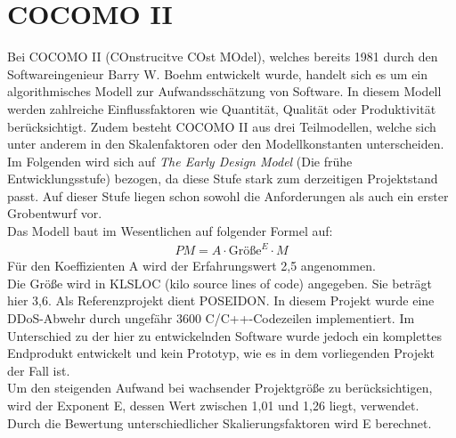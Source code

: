 \documentclass[../review_1.tex]{subfiles}
\begin{document}
\section{COCOMO II}
Bei COCOMO II (COnstrucitve COst MOdel), welches bereits 1981 durch den Softwareingenieur Barry W. Boehm entwickelt wurde, handelt sich es um ein algorithmisches Modell zur Aufwandsschätzung von Software. In diesem Modell werden zahlreiche Einflussfaktoren wie Quantität, Qualität oder Produktivität berücksichtigt. Zudem besteht COCOMO II aus drei Teilmodellen, welche sich unter anderem in den Skalenfaktoren oder den Modellkonstanten unterscheiden. Im Folgenden wird sich auf \textit{\glqq The Early Design Model\grqq{}} (Die frühe Entwicklungsstufe) bezogen, da diese Stufe stark zum derzeitigen Projektstand passt. Auf dieser Stufe liegen schon sowohl die Anforderungen als auch ein erster Grobentwurf vor.\\
Das Modell baut im Wesentlichen auf folgender Formel auf:
\begin{align}
    PM = A \cdot \text{Größe}^E \cdot M
    \label{formel1}
\end{align}
Für den Koeffizienten A wird der Erfahrungswert 2,5 angenommen.\\
Die Größe wird in KLSLOC (kilo source lines of code) angegeben. Sie beträgt hier 3,6. Als Referenzprojekt dient POSEIDON\cite{testFab}.
In diesem Projekt wurde eine DDoS-Abwehr durch ungefähr 3600 C/C++-Codezeilen implementiert. Im Unterschied zu der hier zu entwickelnden Software wurde jedoch ein komplettes Endprodukt entwickelt und kein Prototyp, wie es in dem vorliegenden Projekt der Fall ist.\\
Um den steigenden Aufwand bei wachsender Projektgröße zu berücksichtigen, wird der Exponent E, dessen Wert zwischen 1,01 und 1,26 liegt, verwendet. Durch die Bewertung unterschiedlicher Skalierungsfaktoren wird E berechnet. \\ \newline
\end{document}
